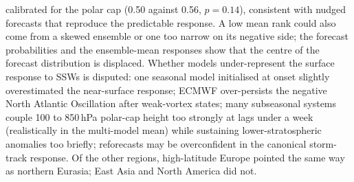 \documentclass[11pt]{article}
\begin{document}
calibrated for the polar cap (0.50 against 0.56, $p = 0.14$), consistent with nudged forecasts that reproduce the predictable response\cite{dai25}. A low mean rank could also come from a skewed ensemble or one too narrow on its negative side; the forecast probabilities and the ensemble-mean responses show that the centre of the forecast distribution is displaced. Whether models under-represent the surface response to SSWs is disputed: one seasonal model initialised at onset slightly overestimated the near-surface response\cite{sigmond13}; ECMWF over-persists the negative North Atlantic Oscillation after weak-vortex states\cite{kolstad20}; many subseasonal systems couple 100 to 850\,hPa polar-cap height too strongly at lags under a week (realistically in the multi-model mean) while sustaining lower-stratospheric anomalies too briefly\cite{garfinkel25}; reforecasts may be overconfident in the canonical storm-track response\cite{afargan24}. Of the other regions, high-latitude Europe pointed the same way as northern Eurasia; East Asia and North America did not.
\end{document}
